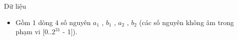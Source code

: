 Dữ liệu
\begin{itemize}
	\item Gồm 1 dòng 4 số nguyên $a_{1}$ , $b_{1}$ , $a_{2}$ , $b_{2}$ (các số nguyên không âm trong phạm vi [0..$2^{31}$ - 1]).
\end{itemize}